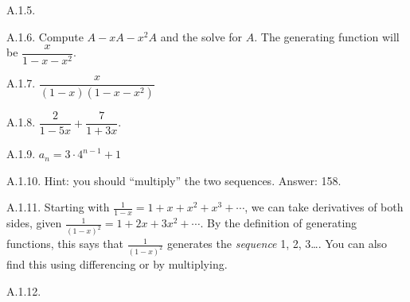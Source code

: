 \begin {itemize}
\begin{ans}{A.1.5.}
\end{ans}
\begin{ans}{A.1.6.}
		Compute $A - xA - x^2A$ and the solve for $A$.  The generating function will be $\dfrac{x}{1-x-x^2}$.  %
	
\end{ans}
\begin{ans}{A.1.7.}
		$\dfrac{x}{(1-x)(1-x-x^2)}$  %
	
\end{ans}
\begin{ans}{A.1.8.}
		$\dfrac{2}{1-5x} + \dfrac{7}{1+3x}$.  %
	
\end{ans}
\begin{ans}{A.1.9.}
		$a_n = 3\cdot 4^{n-1} + 1$  %
	
\end{ans}
\begin{ans}{A.1.10.}
		Hint: you should ``multiply'' the two sequences.  Answer: 158.  %
	
\end{ans}
\begin{ans}{A.1.11.}
		Starting with $\frac{1}{1-x} = 1 + x + x^2 + x^3 +\cdots$, we can take derivatives of both sides, given $\frac{1}{(1-x)^2} = 1 + 2x + 3x^2 + \cdots$.  By the definition of generating functions, this says that $\frac{1}{(1-x)^2}$ generates the {\em sequence} 1, 2, 3\ldots.  You can also find this using differencing or by multiplying.
	
\end{ans}
\begin{ans}{A.1.12.}
\end{ans}
\end{itemize}
